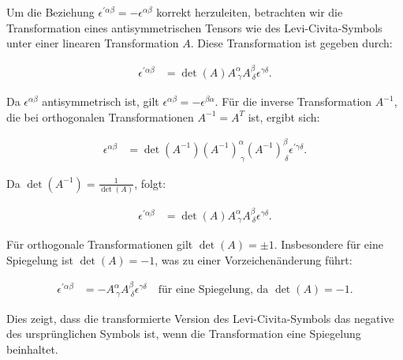 Um die Beziehung $\epsilon^{\prime \alpha \beta} = -\epsilon^{\alpha \beta}$ korrekt herzuleiten, betrachten wir die Transformation eines antisymmetrischen Tensors wie des Levi-Civita-Symbols unter einer linearen Transformation $A$. Diese Transformation ist gegeben durch:

\begin{align*}
\epsilon^{\prime \alpha \beta} &= \det(A) A^\alpha_{\ \gamma} A^\beta_{\ \delta} \epsilon^{\gamma \delta}.
\end{align*}

Da $\epsilon^{\alpha \beta}$ antisymmetrisch ist, gilt $\epsilon^{\alpha \beta} = -\epsilon^{\beta \alpha}$. Für die inverse Transformation $A^{-1}$, die bei orthogonalen Transformationen $A^{-1} = A^T$ ist, ergibt sich:

\begin{align*}
\epsilon^{\alpha \beta} &= \det(A^{-1}) (A^{-1})^\alpha_{\ \gamma} (A^{-1})^\beta_{\ \delta} \epsilon^{\prime \gamma \delta}.
\end{align*}

Da $\det(A^{-1}) = \frac{1}{\det(A)}$, folgt:

\begin{align*}
\epsilon^{\prime \alpha \beta} &= \det(A) A^\alpha_{\ \gamma} A^\beta_{\ \delta} \epsilon^{\gamma \delta}.
\end{align*}

Für orthogonale Transformationen gilt $\det(A) = \pm 1$. Insbesondere für eine Spiegelung ist $\det(A) = -1$, was zu einer Vorzeichenänderung führt:

\begin{align*}
\epsilon^{\prime \alpha \beta} &= - A^\alpha_{\ \gamma} A^\beta_{\ \delta} \epsilon^{\gamma \delta} \quad \text{für eine Spiegelung, da } \det(A) = -1.
\end{align*}

Dies zeigt, dass die transformierte Version des Levi-Civita-Symbols das negative des ursprünglichen Symbols ist, wenn die Transformation eine Spiegelung beinhaltet.


